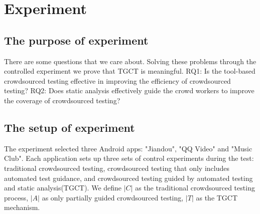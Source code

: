 \section{Experiment}

\subsection{The purpose of experiment}
There are some questions that we care about. Solving these problems through the controlled experiment we prove that TGCT is meaningful. RQ1: Is the tool-based crowdsourced testing effective in improving the efficiency of crowdsourced testing? RQ2: Does static analysis effectively guide the crowd workers to improve the coverage of crowdsourced testing? 

\subsection{The setup of experiment}
The experiment selected three Android apps: "Jiandou", "QQ Video" and "Music Club". Each application sets up three sets of control experiments during the test: traditional crowdsourced testing, crowdsourced testing that only includes automated test guidance, and crowdsourced testing guided by automated testing and static analysis(TGCT). We define $\left|C\right|$ as the traditional crowdsourced testing process, $\left|A\right|$ as only partially guided crowdsourced testing, $\left|T\right|$ as the TGCT mechanism.

